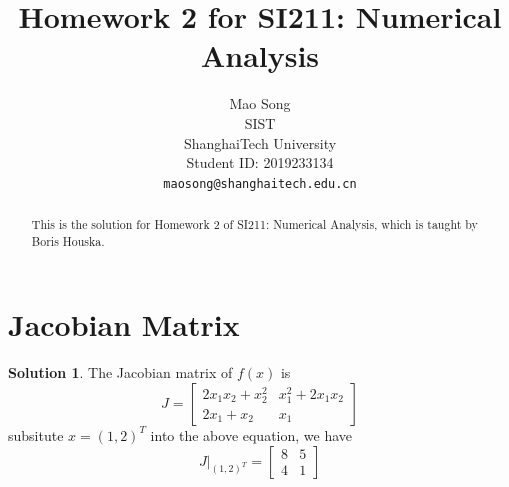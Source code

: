 \documentclass{article}
\title{Homework 2 for SI211: Numerical Analysis}
\author{%
  {Mao Song} \\
  SIST\\
  ShanghaiTech University\\
  Student ID: 2019233134 \\
  \texttt{maosong@shanghaitech.edu.cn} \\
}
\theoremstyle{definition}
\newtheorem{solution}{Solution}
\begin{document}
\maketitle

\begin{abstract}
  This is the solution for Homework 2 of SI211: Numerical Analysis, which is taught by Boris Houska.
\end{abstract}

\section{Jacobian Matrix}
\begin{solution}
  The Jacobian matrix of $f(x)$ is
  \begin{equation}
    J=\begin{bmatrix}
      2x_1x_2+x_2^2& x_1^2+2x_1x_2\\
      2x_1+x_2& x_1
    \end{bmatrix}
  \end{equation}
  subsitute $x=(1,2)^T$ into the above equation, we have
  \begin{equation}
    J|_{(1,2)^T}=\begin{bmatrix}
      8& 5\\
      4& 1
    \end{bmatrix}
  \end{equation}
\end{solution}
\end{document}
